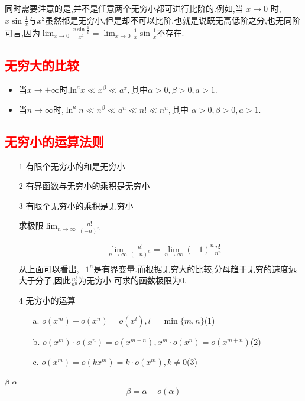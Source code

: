 \documentclass[12pt, a4paper, oneside, UTF8]{ctexbook}  %
\begin{document}
同时需要注意的是,并不是任意两个无穷小都可进行比阶的.例如,当 $x\to 0$ 时,$x\sin\frac1x$与$x^2$虽然都是无穷小,但是却不可以比阶,也就是说既无高低阶之分,也无同阶可言,因为$\lim_{x \to 0}\frac{x \sin \frac{1}{x}}{x^2}=\lim_{x\to0}\frac1x\sin\frac1x$不存在.
\subsection{\textcolor{red}{无穷大的比较}}
\begin{itemize}
    \item 当$x \to +\infty$时,$\mathrm{ln}^ax\ll x^\beta\ll a^x,\text{其中}\alpha>0,\beta>0,a>1.$
    \item 当$n \to \infty$时,$\ln^an\ll n^\beta\ll a^n\ll n!\ll n^n,\text{其中 }\alpha>0,\beta>0,a>1.$
\end{itemize}
\subsection{\textcolor{red}{无穷小的运算法则}}
\begin{itemize}
    \item[1] 有限个无穷小的和是无穷小
    \item[2] 有界函数与无穷小的乘积是无穷小
    \item[3] 有限个无穷小的乘积是无穷小
        \begin{problem}
        求极限$\lim _{n \to \infty} \frac{n!}{(-n)^n}$
        \end{problem}
        \begin{solution}
            \begin{align*}
                 & \lim _{n \to \infty} \frac{n!}{(-n)^n}=\lim_{n \to \infty} (-1)^n \frac{n!}{n^n} \\
            \end{align*}
            从上面可以看出,$-1^n$是有界变量.而根据无穷大的比较,分母趋于无穷的速度远大于分子,因此$\frac{n!}{n^n}为无穷小$
            可求的函数极限为0.
        \end{solution}
    \item[4] 无穷小的运算
        \begin{itemize}
            \item[a.] $o(x^m)\pm o(x^n)=o(x^l),l=\min\{ m,n\}$(1)
            \item[b.] $o(x^m)\cdot o(x^n)=o(x^{m+n}),x^m \cdot o(x^n)=o(x^{m+n})$(2)
            \item[c.] $o(x^m)=o(kx^m)=k\cdot o(x^m),k \neq 0$(3)
        \end{itemize}
\end{itemize}
\begin{them}{}{}
    $\beta$ $\alpha$ 
    $$
        \beta =\alpha +o(\alpha)
    $$
\end{them}
\end{document}
